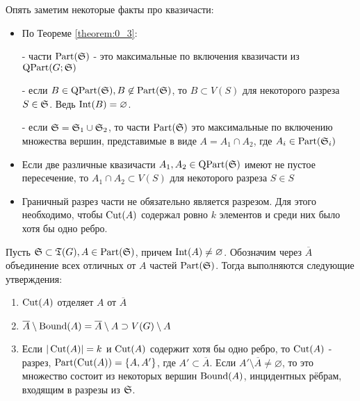 Опять заметим некоторые факты про квазичасти:

\begin{itemize}
	\item По Теореме \ref{theorem:0_3}:

		- части $\Part(\S)$ - это максимальные по включения квазичасти из  $\QPart(G; \S)$

		- если  $B \in \QPart(\S), B \not \in \Part(\S)$, то $B \subset V(S)$ для некоторого разреза  $S \in \S$. Ведь $\Int(B) = \varnothing$.

		- если  $\S = \S_1 \cup \S_2$, то части  $\Part(\S)$ это максимальные по включению множества вершин, представимые в виде  $A = A_1 \cap A_2$, где $A_i \in \Part(\S_i)$
	
	\item Если две различные квазичасти $A_1, A_2 \in \QPart(\S)$ имеют не пустое пересечение, то $A_1 \cap A_2 \subset V(S)$ для некоторого разреза $S \in S$
	
	\item Граничный разрез части не обязательно является разрезом.
		Для этого необходимо, чтобы  $\Cut(A)$ содержал ровно  $k$ элементов и среди них было хотя бы одно ребро.
\end{itemize}

\begin{customlm}{6} \label{lemma:0_6}
	Пусть $\S \subset \T(G), A \in \Part(\S)$, причем  $\Int(A) \neq \varnothing$.
	Обозначим через  $\overline A$ объединение всех отличных от  $A$ частей  $\Part(\S)$.
	Тогда выполняются следующие утверждения:

	\begin{enumerate}
		\item $\Cut(A)$ отделяет  $A$ от  $\overline A$
		\item  $\overline A \setminus \Bound(A) = \overline A \setminus A \supset V(G) \setminus A$
		\item Если  $|\Cut(A)| = k$ и  $\Cut(A)$ содержит хотя бы одно ребро, то  $\Cut(A)$ - разрез,  $\Part(\Cut(A)) = \{A, A'\}$, где $A' \subset \overline A$.
			Если  $A' \setminus \overline A \neq \varnothing$, то это множество состоит из некоторых вершин  $\Bound(A)$, инцидентных рёбрам, входящим в разрезы из  $\S$.
	\end{enumerate}

\end{customlm}

